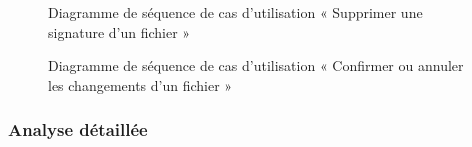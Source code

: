 \begin{figure}[H]
  \centering
  \caption{Diagramme de séquence de cas d'utilisation « Supprimer une signature d'un fichier »}
  \label{fig:sequence_delete_signature_sp4}
\end{figure}
\begin{figure}[H]
  \centering
  \caption{Diagramme de séquence de cas d'utilisation « Confirmer ou annuler les changements d'un fichier »}
  \label{fig:sequence_save_cancel_siganture}
\end{figure}



\subsubsection{Analyse détaillée}

